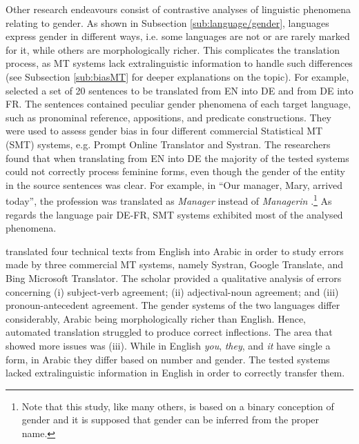 Other research endeavours consist of contrastive analyses of linguistic phenomena relating to gender. As shown in Subsection \ref{sub:language/gender}, languages express gender in different ways, i.e. some languages are not or are rarely marked for it, while others are morphologically richer. This complicates the translation process, as MT systems lack extralinguistic information to handle such differences (see Subsection \ref{sub:biasMT} for deeper explanations on the topic). For example, \textcite{frank2004gender} selected a set of 20 sentences to be translated from EN into DE and from DE into FR. The sentences contained peculiar gender phenomena of each target language, such as pronominal reference, appositions, and predicate constructions. They were used to assess gender bias in four different commercial Statistical MT (SMT) systems, e.g. Prompt Online Translator and Systran. The researchers found that when translating from EN into DE the majority of the tested systems could not correctly process feminine forms, even though the gender of the entity in the source sentences was clear. For example, in ``Our manager, Mary, arrived today'', the profession was translated as \textit{Manager} instead of \textit{Managerin} \citep[5]{frank2004gender}.\footnote{Note that this study, like many others, is based on a binary conception of gender and it is supposed that gender can be inferred from the proper name.} As regards the language pair DE-FR, SMT systems exhibited most of the analysed phenomena.

\textcite{abu2017errors} translated four technical texts from English into Arabic in order to study errors made by three commercial MT systems, namely Systran, Google Translate, and Bing Microsoft Translator. The scholar provided a qualitative analysis of errors concerning (i) subject-verb agreement; (ii) adjectival-noun agreement; and (iii) pronoun-antecedent agreement. The gender systems of the two languages differ considerably, Arabic being morphologically richer than English. Hence, automated translation struggled to produce correct inflections. The area that showed more issues was (iii).  While in English \textit{you}, \textit{they}, and \textit{it} have single a form, in Arabic they differ based on number and gender. The tested systems lacked extralinguistic information in English in order to correctly transfer them.

